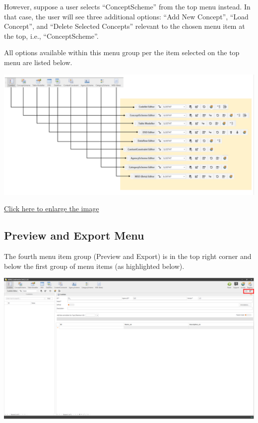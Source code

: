 \documentclass[
]{book}
\theoremstyle{definition}
\theoremstyle{definition}
\theoremstyle{definition}
\theoremstyle{definition}
\theoremstyle{remark}
\begin{document}
However, suppose a user selects ``ConceptScheme'' from the top menu instead. In that case, the user will see three additional options: ``Add New Concept'', ``Load Concept'', and ``Delete Selected Concepts'' relevant to the chosen menu item at the top, i.e., ``ConceptScheme''.

All options available within this menu group per the item selected on the top menu are listed below.

\begin{center}\includegraphics[width=1\linewidth]{./images/image032} \end{center}

\href{images/image032.png}{Click here to enlarge the image}

\hypertarget{preview-and-export-menu}{%
\subsection{Preview and Export Menu}\label{preview-and-export-menu}}

The fourth menu item group (Preview and Export) is in the top right corner and below the first group of menu items (as highlighted below).

\begin{center}\includegraphics[width=1\linewidth]{./images/image034} \end{center}
\end{document}
